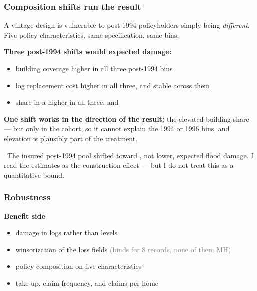 \documentclass[11pt,xcolor={dvipsnames},hyperref={pdftex,pdfpagemode=UseNone,hidelinks,pdfdisplaydoctitle=true},usepdftitle=false,aspectratio=169]{beamer}
\newcommand{\gc}[1]{{\footnotesize\textcolor{gray}{#1}}}
\begin{document}
\begin{frame}[t]\label{frame:composition}
    \frametitle{Composition shifts run  the result}

    A vintage design is vulnerable to post-1994 policyholders simply being \emph{different}. Five policy characteristics, same specification, same bins:

    \vspace{0.8em}
    \pause

    \textbf{Three post-1994 shifts would  expected damage:}
    \begin{itemize}\setlength{\itemsep}{0.2em}
        \item building coverage higher in all three post-1994 bins
        \item log replacement cost higher in all three, and stable across them
        \item share in a  higher in all three, and 
    \end{itemize}

    \vspace{0.7em}
    \pause

    \textbf{One shift works in the direction of the result:} the elevated-building share --- but only in the  cohort, so it cannot explain the 1994 or 1996 bins, and elevation is plausibly part of the treatment.

    \vspace{0.9em}
    \pause

    \so\ The insured post-1994 pool shifted toward , not lower, expected flood damage. I read the estimates as  the construction effect --- but I do not treat this as a quantitative bound.

    \vspace{0.4em}
    \hfill \hyperlink{frame:composition-table}{}

\end{frame}

\begin{frame}\label{frame:robustness}
    \frametitle{Robustness}

    \textbf{Benefit side}
    \begin{itemize}
        \item damage in logs rather than levels \hfill \hyperlink{frame:levels-logs}{}
        \item winsorization of the loss fields \gc{(binds for 8 records, none of them MH)}
        \item policy composition on five characteristics \hfill \hyperlink{frame:composition-table}{}
        \item take-up, claim frequency, and claims per home \hfill \hyperlink{frame:take-up}{}
    \end{itemize}


\end{frame}
\end{document}
